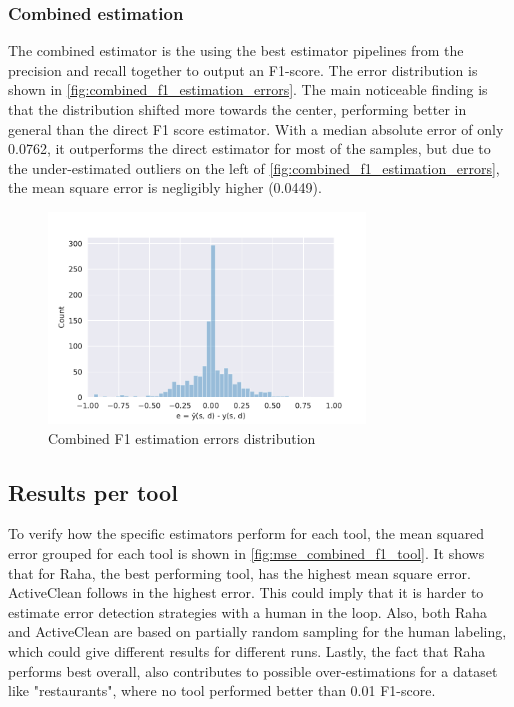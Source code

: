 \subsubsection{Combined estimation}
The combined estimator is the using the best estimator pipelines from the precision and recall together to output an F1-score. The error distribution is shown in \autoref{fig:combined_f1_estimation_errors}. The main noticeable finding is that the distribution shifted more towards the center, performing better in general than the direct F1 score estimator. With a median absolute error of only 0.0762, it outperforms the direct estimator for most of the samples, but due to the under-estimated outliers on the left of \autoref{fig:combined_f1_estimation_errors}, the mean square error is negligibly higher (0.0449). 

\begin{figure}[h]
    \centering
    \includegraphics[width=0.75\textwidth]{thesis/Figures/RQ2/15_error_histogramcell_f1_combined.pdf}
    \caption{Combined F1 estimation errors distribution}
    \label{fig:combined_f1_estimation_errors}
\end{figure}

\subsection{Results per tool}
To verify how the specific estimators perform for each tool, the mean squared error grouped for each tool is shown in \autoref{fig:mse_combined_f1_tool}. It shows that for Raha, the best performing tool, has the highest mean square error. ActiveClean follows in the highest error. This could imply that it is harder to estimate error detection strategies with a human in the loop. Also, both Raha and ActiveClean are based on partially random sampling for the human labeling, which could give different results for different runs. Lastly, the fact that Raha performs best overall, also contributes to possible over-estimations for a dataset like "restaurants", where no tool performed better than 0.01 F1-score. 

